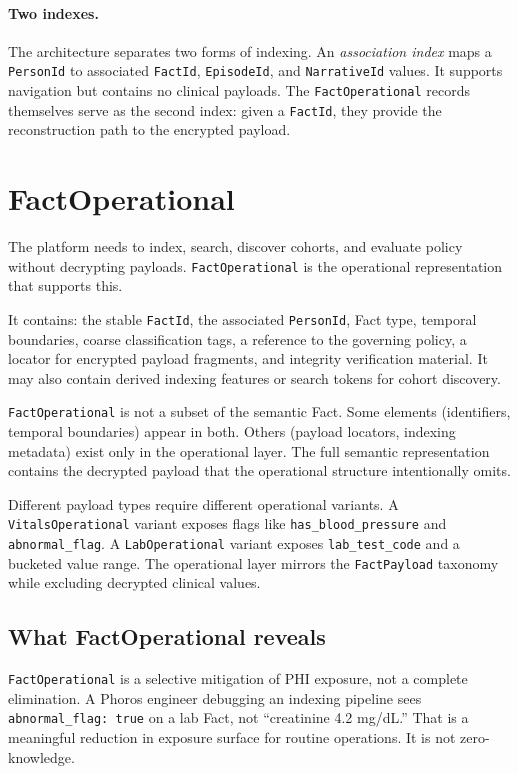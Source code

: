\documentclass[11pt]{article}
\begin{document}
\paragraph{Two indexes.}
The architecture separates two forms of indexing. An \emph{association
index} maps a \texttt{PersonId} to associated \texttt{FactId},
\texttt{EpisodeId}, and \texttt{NarrativeId} values. It supports
navigation but contains no clinical payloads. The
\texttt{FactOperational} records themselves serve as the second index:
given a \texttt{FactId}, they provide the reconstruction path to the
encrypted payload.

\section{FactOperational}
\label{sec:factoperational}

The platform needs to index, search, discover cohorts, and evaluate
policy without decrypting payloads. \texttt{FactOperational} is the
operational representation that supports this.

It contains: the stable \texttt{FactId}, the associated
\texttt{PersonId}, Fact type, temporal boundaries, coarse classification
tags, a reference to the governing policy, a locator for encrypted
payload fragments, and integrity verification material. It may also
contain derived indexing features or search tokens for cohort discovery.

\texttt{FactOperational} is not a subset of the semantic Fact. Some
elements (identifiers, temporal boundaries) appear in both. Others
(payload locators, indexing metadata) exist only in the operational
layer. The full semantic representation contains the decrypted payload
that the operational structure intentionally omits.

Different payload types require different operational variants. A
\texttt{VitalsOperational} variant exposes flags like
\texttt{has\_blood\_pressure} and \texttt{abnormal\_flag}. A
\texttt{LabOperational} variant exposes \texttt{lab\_test\_code} and a
bucketed value range. The operational layer mirrors the
\texttt{FactPayload} taxonomy while excluding decrypted clinical values.

\subsection{What FactOperational reveals}
\label{sec:factoperational-leakage}

\texttt{FactOperational} is a selective mitigation of PHI exposure, not
a complete elimination. A Phoros engineer debugging an indexing pipeline
sees \texttt{abnormal\_flag: true} on a lab Fact, not ``creatinine 4.2
mg/dL.'' That is a meaningful reduction in exposure surface for routine
operations. It is not zero-knowledge.
\end{document}
